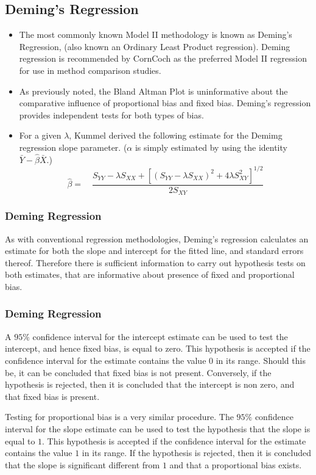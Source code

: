 \documentclass[compress]{beamer}        %
\begin{document}
\subsection{Deming's Regression}
\begin{frame}

\begin{itemize}
\item The most commonly known Model II methodology is known as Deming's
Regression, (also known an Ordinary Least Product regression).
Deming regression is recommended by \alert{CornCoch} as the
preferred Model II regression for use in method comparison
studies. 
\item As previously noted, the Bland Altman Plot is
uninformative about the comparative influence of proportional bias
and fixed bias. Deming's regression provides independent tests for
both types of bias.

\item For a given $\lambda$, \alert{Kummel} derived the following
estimate for the Demimg regression slope parameter. ($\alpha$ is
simply estimated by using the identity
$\bar{Y}-\hat{\beta}\bar{X}$.)
\begin{equation}
\hat{\beta} =\quad \frac{S_{YY} - \lambda S_{XX}+[(S_{YY} -
\lambda S_{XX})^{2}+ 4\lambda S^{2}_{XY}]^{1/2}}{2S_{XY}}
\end{equation}
\end{itemize}
\end{frame}
\begin{frame}
\frametitle{Deming Regression}
As with conventional regression methodologies, Deming's regression
calculates an estimate for both the slope and intercept for the
fitted line, and standard errors thereof. Therefore there is
sufficient information to carry out hypothesis tests on both
estimates, that are informative about presence of fixed and
proportional bias.
\end{frame}
\begin{frame}
\frametitle{Deming Regression}
A $95\%$ confidence interval for the intercept estimate can be
used to test the intercept, and hence fixed bias, is equal to
zero. This hypothesis is accepted if the confidence interval for
the estimate contains the value $0$ in its range. Should this be,
it can be concluded that fixed bias is not present. Conversely, if
the hypothesis is rejected, then it is concluded that the
intercept is non zero, and that fixed bias is present.
\end{frame}
\begin{frame}
Testing for proportional bias is a very similar procedure. The
$95\%$ confidence interval for the slope estimate can be used to
test the hypothesis that the slope is equal to $1$. This
hypothesis is accepted if the confidence interval for the estimate
contains the value $1$ in its range. If the hypothesis is
rejected, then it is concluded that the slope is significant
different from $1$ and that a proportional bias exists.
\end{frame}
\end{document}
